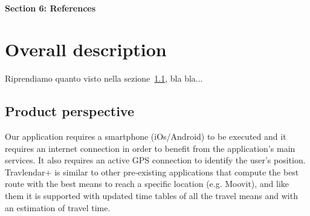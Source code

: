 \documentclass[12pt,titlepage]{article}
\begin{document}
\paragraph{Section 6: References}
\pagebreak

\section{Overall description}\label{sec:crit}

Riprendiamo quanto visto nella sezione~\ref{sec:mod1}, bla bla...
\subsection{Product perspective}\label{sec:mod1}
Our application requires a smartphone (iOs/Android) to be executed and it requires an internet connection in order to benefit from the application's main services.
It also requires an active GPS connection to identify the user's position. 
Travlendar+ is similar to other pre-existing applications that compute the best route with the best means to reach a specific location (e.g. Moovit), and like them it is supported with updated time tables of all the travel means and with an estimation of travel time. 
\end{document}
